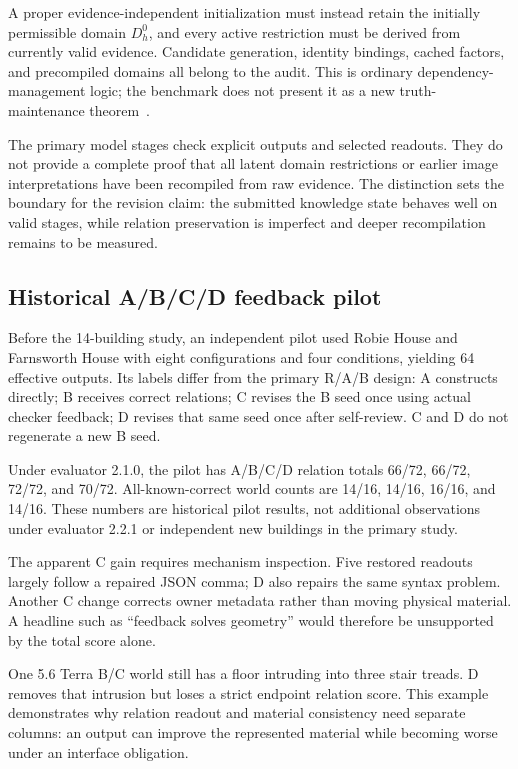 A proper evidence-independent initialization must instead retain the initially permissible domain $D_h^0$, and every active restriction must be derived from currently valid evidence. Candidate generation, identity bindings, cached factors, and precompiled domains all belong to the audit. This is ordinary dependency-management logic; the benchmark does not present it as a new truth-maintenance theorem~\cite{doyle1979}.

The primary model stages check explicit outputs and selected readouts. They do not provide a complete proof that all latent domain restrictions or earlier image interpretations have been recompiled from raw evidence. The distinction sets the boundary for the revision claim: the submitted knowledge state behaves well on valid stages, while relation preservation is imperfect and deeper recompilation remains to be measured.

\subsection{Historical A/B/C/D feedback pilot}
Before the 14-building study, an independent pilot used Robie House and Farnsworth House with eight configurations and four conditions, yielding 64 effective outputs. Its labels differ from the primary R/A/B design: A constructs directly; B receives correct relations; C revises the B seed once using actual checker feedback; D revises that same seed once after self-review. C and D do not regenerate a new B seed.

Under evaluator 2.1.0, the pilot has A/B/C/D relation totals 66/72, 66/72, 72/72, and 70/72. All-known-correct world counts are 14/16, 14/16, 16/16, and 14/16. These numbers are historical pilot results, not additional observations under evaluator 2.2.1 or independent new buildings in the primary study.

The apparent C gain requires mechanism inspection. Five restored readouts largely follow a repaired JSON comma; D also repairs the same syntax problem. Another C change corrects owner metadata rather than moving physical material. A headline such as ``feedback solves geometry'' would therefore be unsupported by the total score alone.

One 5.6 Terra B/C world still has a floor intruding into three stair treads. D removes that intrusion but loses a strict endpoint relation score. This example demonstrates why relation readout and material consistency need separate columns: an output can improve the represented material while becoming worse under an interface obligation.

